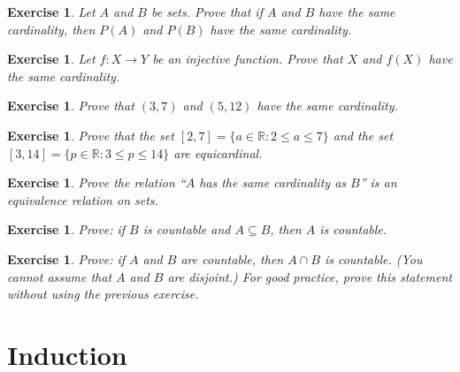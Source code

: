 \documentclass{book}
\newcounter{ekcounter}%
\theoremstyle{ekimcustom}
\newtheorem{exercise}[ekcounter]{Exercise}
\begin{document}
\begin{exercise}
Let $A$ and $B$ be sets. Prove that if $A$ and $B$ have the same cardinality, then $P(A)$ and $P(B)$ have the same cardinality.%
\end{exercise}

\begin{exercise}
Let $f : X \to Y$ be an injective function. Prove that $X$ and $f(X)$ have the same cardinality.%
\end{exercise}

\begin{exercise}
Prove that $(3,7)$ and $(5,12)$ have the same cardinality.%
\end{exercise}

\begin{exercise}
Prove that the set $[2,7] = \{a \in \mathbb{R} : 2 \leq a \leq 7\}$ and the set $[3,14]=\{p \in \mathbb{R} : 3 \leq p \leq 14\}$ are equicardinal.
\end{exercise}


\begin{exercise}
Prove the relation ``$A$ has the same cardinality as $B$'' is an equivalence relation on sets.
\end{exercise}

\begin{exercise}
Prove: if $B$ is countable and $A \subseteq B$, then $A$ is countable. %
\end{exercise}

\begin{exercise}
Prove: if $A$ and $B$ are countable, then $A \cap B$ is countable. (You cannot assume that $A$ and $B$ are disjoint.) For good practice, prove this statement without using the previous exercise.%
\end{exercise}

\section{Induction}
\end{document}

